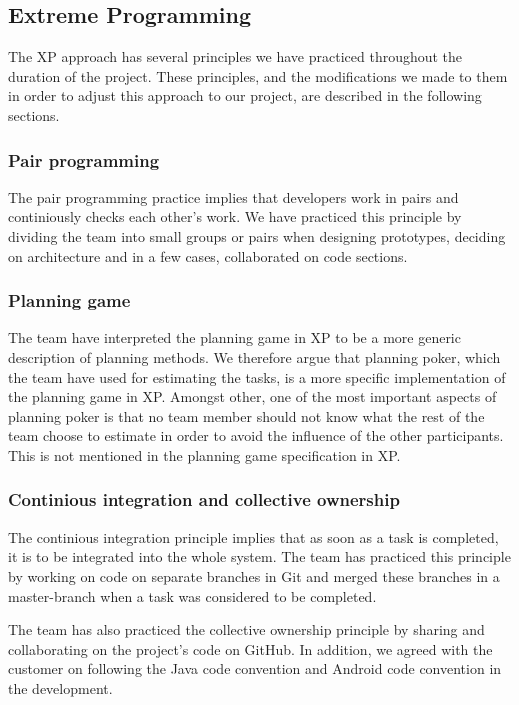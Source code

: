\subsection{Extreme Programming}
The XP approach has several principles we have practiced throughout the duration of the project. These principles, and the modifications we made to them in order to adjust this approach to our project, are described in the following sections.

\subsubsection{Pair programming}
The pair programming practice implies that developers work in pairs and continiously checks each other's work. We have practiced this principle by dividing the team into small groups or pairs when designing prototypes, deciding on architecture and in a few cases, collaborated on code sections.


\subsubsection{Planning game}
The team have interpreted the planning game in XP to be a more generic description of planning methods. We therefore argue that planning poker, which the team have used for estimating the tasks, is a more specific implementation of the planning game in XP. Amongst other, one of the most important aspects of planning poker is that no team member should not know what the rest of the team choose to estimate in order to avoid the influence of the other participants. This is not mentioned in the planning game specification in XP.

\subsubsection{Continious integration and collective ownership}
The continious integration principle implies that as soon as a task is completed, it is to be integrated into the whole system. The team has practiced this principle by working on code on separate branches in Git and merged these branches in a master-branch when a task was considered to be completed.

The team has also practiced the collective ownership principle by sharing and collaborating on the project's code on GitHub. In addition, we agreed with the customer on following the Java code convention and Android code convention in the development.


